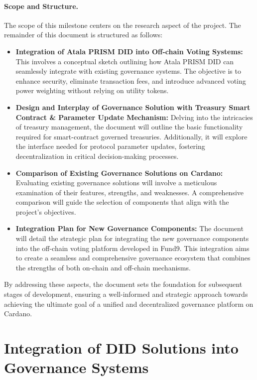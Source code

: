 \documentclass[11pt]{article}
\begin{document}
\paragraph{Scope and Structure.} The scope of this milestone centers on the research aspect of the project. The remainder of this document is structured as follows:
\begin{itemize}
\item \textbf{Integration of Atala PRISM DID into Off-chain Voting Systems:} This involves a conceptual sketch outlining how Atala PRISM DID can seamlessly integrate with existing governance systems. The objective is to enhance security, eliminate transaction fees, and introduce advanced voting power weighting without relying on utility tokens.
\item \textbf{Design and Interplay of Governance Solution with Treasury Smart Contract \& Parameter Update Mechanism:} Delving into the intricacies of treasury management, the document will outline the basic functionality required for smart-contract governed treasuries. Additionally, it will explore the interface needed for protocol parameter updates, fostering decentralization in critical decision-making processes.
\item \textbf{Comparison of Existing Governance Solutions on Cardano:} Evaluating existing governance solutions will involve a meticulous examination of their features, strengths, and weaknesses. A comprehensive comparison will guide the selection of components that align with the project's objectives.
\item \textbf{Integration Plan for New Governance Components:} The document will detail the strategic plan for integrating the new governance components into the off-chain voting platform developed in Fund9. This integration aims to create a seamless and comprehensive governance ecosystem that combines the strengths of both on-chain and off-chain mechanisms.
\end{itemize}

By addressing these aspects, the document sets the foundation for subsequent stages of development, ensuring a well-informed and strategic approach towards achieving the ultimate goal of a unified and decentralized governance platform on Cardano.


\section{Integration of DID Solutions into Governance Systems}
\end{document}
